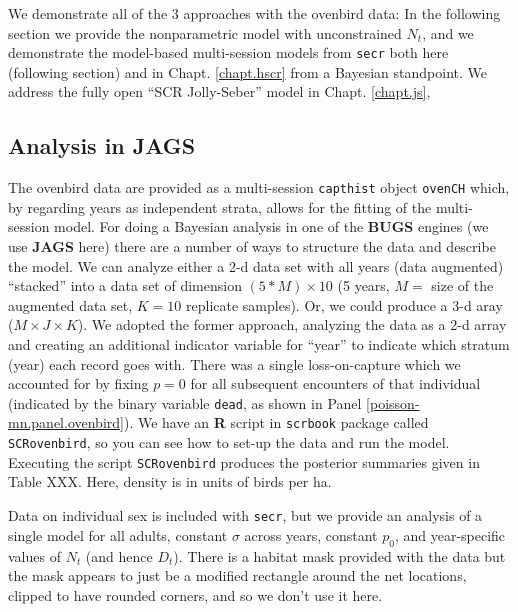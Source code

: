 We
demonstrate all of the 3 approaches with the ovenbird data: In the
following section we provide the nonparametric model with
unconstrained $N_{t}$, 
 and we demonstrate  the model-based
multi-session models from \mbox{\tt secr} both here (following section) and in
Chapt. \ref{chapt.hscr} from a Bayesian standpoint.
We address the fully open ``SCR Jolly-Seber''
model in Chapt. \ref{chapt.js},


\subsection{Analysis in JAGS}

The ovenbird data are provided as a multi-session \mbox{\tt capthist}
object \mbox{\tt ovenCH} which, by regarding years as independent
strata, allows for the fitting of the multi-session model.  For doing
a Bayesian analysis in one of the {\bf BUGS} engines (we use {\bf
  JAGS} here) there are a number of ways to structure the data and
describe the model.  We can analyze either a 2-d data set with all
years (data augmented) ``stacked'' into a data set of dimension $(5*M)
\times 10$ (5 years, $M=$ size of the augmented data set, $K=10$
replicate samples). Or, we could produce a 3-d aray ($M \times J
\times K$). We adopted the former approach, analyzing the data as a
2-d array and creating an additional indicator variable for ``year''
to indicate which stratum (year) each record goes with.  There was a
single loss-on-capture which we accounted for by fixing $p=0$ for all
subsequent encounters of that individual (indicated by the binary
variable \mbox{\tt dead}, as shown in Panel
\ref{poisson-mn.panel.ovenbird}).  We have an {\bf R} script in
\mbox{\tt scrbook} package called \mbox{\tt SCRovenbird}, so you can
see how to set-up the data and run the model.  Executing the script
\mbox{\tt SCRovenbird} produces the posterior summaries given in Table
XXX. Here, density is in units of birds per ha.






Data on individual sex is included
with \mbox{\tt secr}, but  we provide an analysis of a single model
for all adults, constant $\sigma$ across years, constant $p_{0}$, and
year-specific values of $N_{t}$ (and hence $D_{t}$). 
 There is a habitat mask provided with the data but the mask
appears to just be a modified rectangle around the net locations,
clipped to have rounded corners, and so we don't use it here. 






